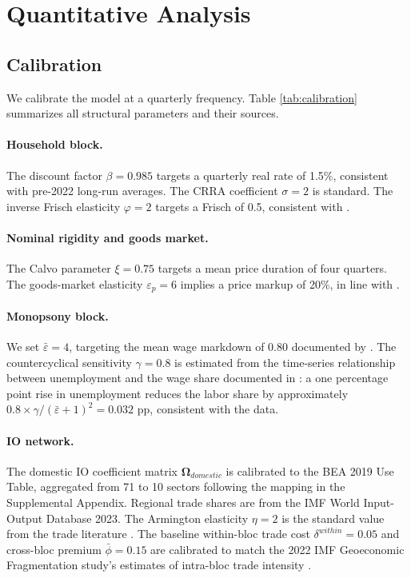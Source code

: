\section{Quantitative Analysis}
\label{sec:quantitative}

\subsection{Calibration}
\label{sec:calibration}

We calibrate the model at a quarterly frequency. Table \ref{tab:calibration}
summarizes all structural parameters and their sources.

\paragraph{Household block.}
The discount factor $\beta = 0.985$ targets a quarterly real rate of 1.5\%,
consistent with pre-2022 long-run averages. The CRRA coefficient $\sigma = 2$
is standard. The inverse Frisch elasticity $\varphi = 2$ targets a Frisch
of 0.5, consistent with \citet{chetty2013}.

\paragraph{Nominal rigidity and goods market.}
The Calvo parameter $\xi = 0.75$ targets a mean price duration of four
quarters. The goods-market elasticity $\varepsilon_p = 6$ implies a price markup
of 20\%, in line with \citet{de2020rise}.

\paragraph{Monopsony block.}
We set $\bar\varepsilon = 4$, targeting the mean wage markdown of 0.80
documented by \citet{manning2021monopsony}. The countercyclical sensitivity
$\gamma = 0.8$ is estimated from the time-series relationship between
unemployment and the wage share documented in \citet{rinz2022labor}: a one
percentage point rise in unemployment reduces the labor share by approximately
$0.8 \times \gamma/(\bar\varepsilon+1)^2 = 0.032$ pp, consistent with the
data.

\paragraph{IO network.}
The domestic IO coefficient matrix $\boldsymbol\Omega_{domestic}$ is
calibrated to the BEA 2019 Use Table, aggregated from 71 to 10 sectors
following the mapping in the Supplemental Appendix. Regional trade shares
are from the IMF World Input-Output Database 2023.
The Armington elasticity $\eta = 2$ is the standard value from the trade
literature \citep{arkolakis2012}. The baseline within-bloc trade cost
$\delta^{within} = 0.05$ and cross-bloc premium $\bar\phi = 0.15$ are
calibrated to match the 2022 IMF Geoeconomic Fragmentation study's estimates
of intra-bloc trade intensity \citep{aiyar2023}.

